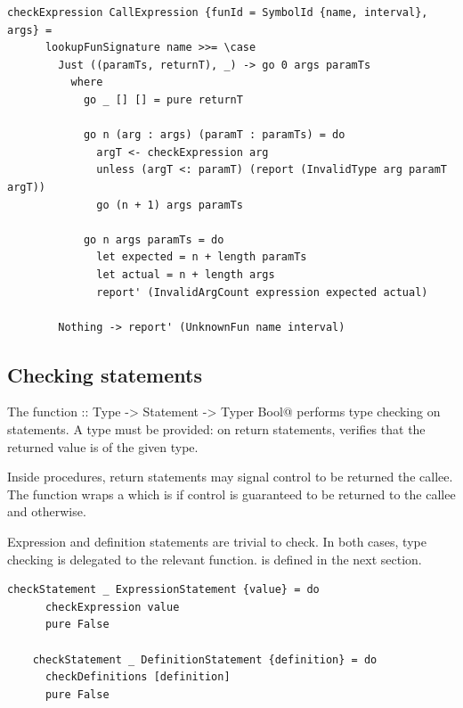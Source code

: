 \documentclass[UdineBachThesis,american,11pt]{PhdThesis}
\begin{document}
  \begin{lstlisting}[gobble=4,basicstyle=\ttfamily\small]
    checkExpression CallExpression {funId = SymbolId {name, interval}, args} =
      lookupFunSignature name >>= \case
        Just ((paramTs, returnT), _) -> go 0 args paramTs
          where
            go _ [] [] = pure returnT

            go n (arg : args) (paramT : paramTs) = do
              argT <- checkExpression arg
              unless (argT <: paramT) (report (InvalidType arg paramT argT))
              go (n + 1) args paramTs

            go n args paramTs = do
              let expected = n + length paramTs
              let actual = n + length args
              report' (InvalidArgCount expression expected actual)

        Nothing -> report' (UnknownFun name interval)
  \end{lstlisting}

  \newpage

  \subsection{Checking statements}

  The function \lstinline@checkStatement :: Type -> Statement -> Typer Bool@
  performs type \linebreak checking on statements. A type must be provided: on
  return statements, \lstinline@checkStatement@ verifies that the returned value
  is of the given type.

  Inside procedures, return statements may signal control to be returned the
  callee. The function \lstinline@checkStatement@ wraps a \lstinline@Bool@ which
  is \lstinline@True@ if control is guaranteed to be returned to the callee and
  \lstinline@False@ otherwise.

  Expression and definition statements are trivial to check. In both cases, type
  checking is delegated to the relevant function. \lstinline@checkDefinitions@
  is defined in the next section.

  \begin{lstlisting}[gobble=4,basicstyle=\ttfamily\small]
    checkStatement _ ExpressionStatement {value} = do
      checkExpression value
      pure False

    checkStatement _ DefinitionStatement {definition} = do
      checkDefinitions [definition]
      pure False
  \end{lstlisting}
\end{document}
